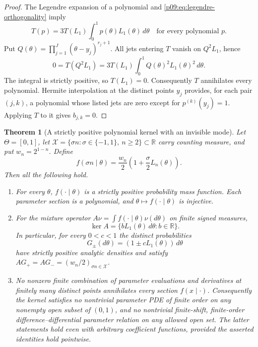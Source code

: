 \documentclass[11pt,letterpaper]{article}
\newtheorem{theorem}{Theorem}[section]
\theoremstyle{definition}
\theoremstyle{remark}
\newcommand{\1}{\mathbf 1}
\begin{document}
\begin{proof}
The Legendre expansion of a polynomial and
\eqref{p09:eq:legendre-orthogonality} imply
\begin{equation}
 T(p)=3T(L_1)\int_0^1 p(\theta)L_1(\theta)\,d\theta
 \quad\text{for every polynomial }p.
 \label{p09:eq:finite-jet-integral}
\end{equation}
Put $Q(\theta)=\prod_{j=1}^J(\theta-y_j)^{r_j+1}$.
All jets entering $T$ vanish on $Q^2L_1$, hence
\[
 0=T(Q^2L_1)
  =3T(L_1)\int_0^1 Q(\theta)^2L_1(\theta)^2\,d\theta.
\]
The integral is strictly positive, so $T(L_1)=0$.  Consequently $T$
annihilates every polynomial.  Hermite interpolation at the distinct
points $y_j$ provides, for each pair $(j,k)$, a polynomial whose listed
jets are zero except for $p^{(k)}(y_j)=1$.  Applying $T$ to it gives
$b_{j,k}=0$.
\end{proof}

\begin{theorem}[A strictly positive polynomial kernel with an invisible mode]
\label{p09:thm:missing-mode-discrete}
Let $\Theta=[0,1]$, let
$\mathcal X=\{\sigma n:\sigma\in\{-1,1\},\ n\ge2\}\subset\mathbb R$
carry counting measure, and put $w_n=2^{1-n}$.  Define
\begin{equation}
 f(\sigma n\mid\theta)
    =\frac{w_n}{2}\left(1+\frac{\sigma}{2}L_n(\theta)\right).
 \label{p09:eq:discrete-missing-mode-kernel}
\end{equation}
Then all the following hold.
\begin{enumerate}
\item For every $\theta$, $f(\cdot\mid\theta)$ is a strictly positive
probability mass function.  Each parameter section is a polynomial,
and $\theta\mapsto f(\cdot\mid\theta)$ is injective.
\item For the mixture operator $A\nu=\int f(\cdot\mid\theta)\nu(d\theta)$
on finite signed measures,
\begin{equation}
 \ker A=\{bL_1(\theta)\,d\theta:b\in\mathbb R\}.
 \label{p09:eq:exact-missing-mode-nullspace}
\end{equation}
In particular, for every $0<c<1$ the distinct probabilities
\begin{equation}
 G_\pm(d\theta)=(1\pm cL_1(\theta))\,d\theta
 \label{p09:eq:indistinguishable-smooth-mixings}
\end{equation}
have strictly positive analytic densities and satisfy
$AG_+=AG_-= (w_n/2)_{\sigma n\in\mathcal X}$.
\item No nonzero finite combination of parameter evaluations and
derivatives at finitely many distinct points annihilates every section
$f(x\mid\cdot)$.  Consequently the kernel satisfies no nontrivial
parameter PDE of finite order on any nonempty open subset of
$(0,1)$, and no nontrivial finite-shift, finite-order
difference--differential parameter relation on any allowed open set.
The latter statements hold even with arbitrary coefficient functions,
provided the asserted identities hold pointwise.
\end{enumerate}
\end{theorem}
\end{document}
